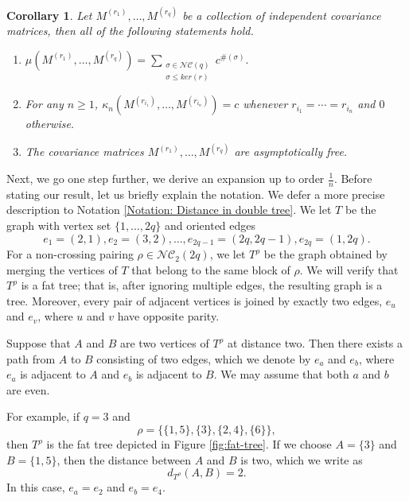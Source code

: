 \documentclass{article}
\newtheorem{corollary}  [theorem]{Corollary}
\theoremstyle{definition}
\newcommand{\NC}{\mathcal{NC}}
\begin{document}
\begin{corollary}\label{Corollary: Moments and cumulants}
Let $M^{(r_1)},\dots, M^{(r_q)}$ be a collection of independent covariance matrices, then all of the following statements hold.
\begin{enumerate}
    \item $\mu(M^{(r_1)},\dots,M^{(r_q)})=\sum_{\substack{\sigma\in \NC(q) \\ \sigma\leq ker(r)}}c^{\#(\sigma)}.$
    \item For any $n\geq 1$, $\kappa_n(M^{(r_{i_1})},\dots,M^{(r_{i_n})})=c$ whenever $r_{i_1}=\cdots =r_{i_n}$ and $0$ otherwise.
    \item The covariance matrices $M^{(r_1)},\dots, M^{(r_q)}$ are asymptotically free.
\end{enumerate}
\end{corollary}

Next, we go one step further, we derive an expansion up to order $\frac{1}{n}$. Before stating our result, let us briefly explain the notation. We defer a more precise description to Notation \ref{Notation: Distance in double tree}. We let $T$ be the graph with vertex set $\{1,\dots,2q\}$ and oriented edges
\[
e_1=(2,1),e_2=(3,2),\dots,e_{2q-1}=(2q,2q-1),e_{2q}=(1,2q).
\]
For a non-crossing pairing $\rho\in\NC_2(2q)$, we let $T^\rho$ be the graph obtained by merging the vertices of $T$ that belong to the same block of $\rho$. We will verify that $T^\rho$ is a fat tree; that is, after ignoring multiple edges, the resulting graph is a tree. Moreover, every pair of adjacent vertices is joined by exactly two edges, $e_u$ and $e_v$, where $u$ and $v$ have opposite parity.

Suppose that $A$ and $B$ are two vertices of $T^\rho$ at distance two. Then there exists a path from $A$ to $B$ consisting of two edges, which we denote by $e_a$ and $e_b$, where $e_a$ is adjacent to $A$ and $e_b$ is adjacent to $B$. We may assume that both $a$ and $b$ are even.

For example, if $q=3$ and
\[
\rho=\{\{1,5\},\{3\},\{2,4\},\{6\}\},
\]
then $T^\rho$ is the fat tree depicted in Figure \ref{fig:fat-tree}. If we choose $A=\{3\}$ and $B=\{1,5\}$, then the distance between $A$ and $B$ is two, which we write as
\[
d_{T^\rho}(A,B)=2.
\]
In this case, $e_a=e_2$ and $e_b=e_4$.
\end{document}
